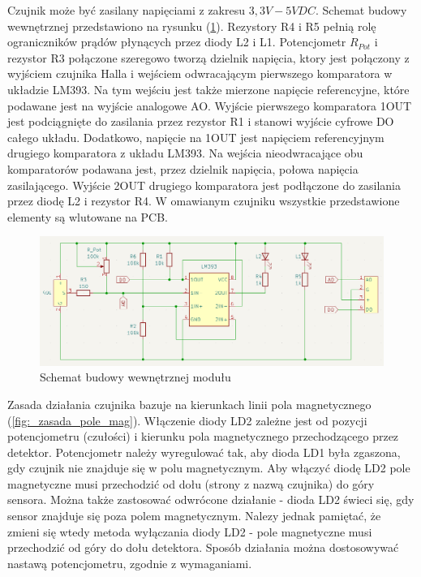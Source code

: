 \documentclass[11pt, a4paper]{article}
\begin{document}
Czujnik może być zasilany napięciami z zakresu $3,3V - 5V DC$. Schemat budowy wewnętrznej przedstawiono na rysunku (\ref{fig:_schemat_modulu}). Rezystory R4 i R5 pełnią rolę ograniczników prądów płynących przez diody L2 i L1. Potencjometr $R_{Pot}$ i rezystor R3 połączone szeregowo tworzą dzielnik napięcia, ktory jest połączony z wyjściem czujnika Halla i wejściem odwracającym pierwszego komparatora w układzie LM393. Na tym wejściu jest także mierzone napięcie referencyjne, które podawane jest na wyjście analogowe AO. Wyjście pierwszego komparatora 1OUT jest podciągnięte do zasilania przez rezystor R1 i stanowi wyjście cyfrowe DO całego układu. Dodatkowo, napięcie na 1OUT jest napięciem referencyjnym drugiego komparatora z układu LM393. Na wejścia nieodwracające obu komparatorów podawana jest, przez dzielnik napięcia, połowa napięcia zasilającego. Wyjście 2OUT drugiego komparatora jest podłączone do zasilania przez diodę L2 i rezystor R4. W omawianym czujniku wszystkie przedstawione elementy są wlutowane na PCB.

\vspace{0.25cm}
\begin{figure}[h]
    \centering
    \includegraphics[width=1.0\textwidth]{fig/KY-024/polaczenie_modulu/schematics_internal.png}
    \caption{Schemat budowy wewnętrznej modułu}
    \label{fig:_schemat_modulu}
\end{figure}
\vspace{0.25cm}

Zasada działania czujnika bazuje na kierunkach linii pola magnetycznego (\ref{fig:_zasada_pole_mag}). Włączenie diody LD2 zależne jest od pozycji potencjometru (czułości) i kierunku pola magnetycznego przechodzącego przez detektor. Potencjometr należy wyregulować tak, aby dioda LD1 była zgaszona, gdy czujnik nie znajduje się w polu magnetycznym. Aby włączyć diodę LD2 pole magnetyczne musi przechodzić od dołu (strony z nazwą czujnika) do góry sensora. Można także zastosować odwrócone działanie - dioda LD2 świeci się, gdy sensor znajduje się poza polem magnetycznym. Nalezy jednak pamiętać, że zmieni się wtedy metoda wyłączania diody LD2 - pole magnetyczne musi przechodzić od góry do dołu detektora. Sposób działania można dostosowywać nastawą potencjometru, zgodnie z wymaganiami.
\end{document}
